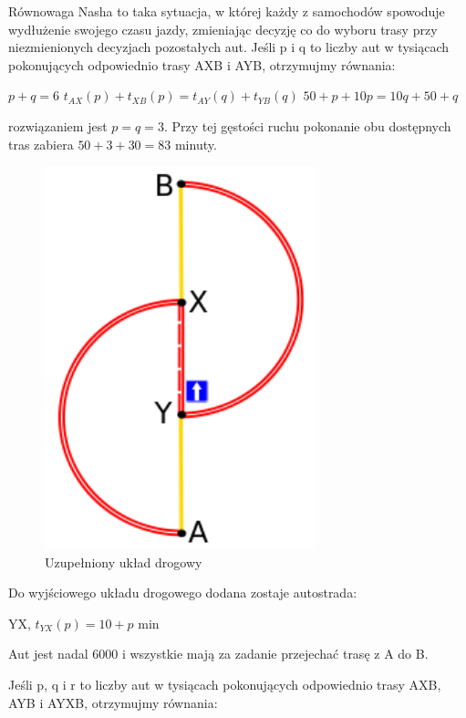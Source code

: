 \documentclass[twoside,12pt]{report}
\begin{document}
Równowaga Nasha to taka sytuacja, w której każdy z samochodów spowoduje wydłużenie swojego czasu jazdy, zmieniając decyzję co do wyboru trasy przy niezmienionych decyzjach pozostałych aut.
\newline\newline
Jeśli p i q to liczby aut w tysiącach pokonujących odpowiednio trasy AXB i AYB, otrzymujmy równania:

\begin{center}
$p+q = 6 $
$t_{AX}(p)+t_{XB}(p) = t_{AY}(q) + t_{YB}(q)$
$50+p+10p = 10q+50+q$
\end{center}
rozwiązaniem jest $p=q=3$.
Przy tej gęstości ruchu pokonanie obu dostępnych tras zabiera $50+3+30=83$ minuty.



\begin{figure}[ht]
\includegraphics[width=0.7\textwidth]{img/braess2}
\caption{Uzupełniony układ drogowy}
\end{figure}

Do wyjściowego układu drogowego dodana zostaje autostrada:

YX, $t_{YX}(p) =  10 + p$ min

Aut jest nadal 6000 i wszystkie mają za zadanie przejechać trasę z A do B.



Jeśli p, q i r to liczby aut w tysiącach pokonujących odpowiednio trasy AXB, AYB i AYXB, otrzymujmy równania:
\end{document}
